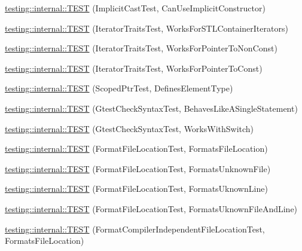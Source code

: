 \begin{DoxyCompactItemize}
\item 
\hyperlink{namespacetesting_1_1internal_ad5c2cf37cc5aa78744012255cae78f9b}{testing\-::internal\-::\-T\-E\-S\-T} (Implicit\-Cast\-Test, Can\-Use\-Implicit\-Constructor)
\item 
\hyperlink{namespacetesting_1_1internal_abd56ca990c5b8c1aea44d15028a74f33}{testing\-::internal\-::\-T\-E\-S\-T} (Iterator\-Traits\-Test, Works\-For\-S\-T\-L\-Container\-Iterators)
\item 
\hyperlink{namespacetesting_1_1internal_a642234d85836450bb8795cf0a8a9f908}{testing\-::internal\-::\-T\-E\-S\-T} (Iterator\-Traits\-Test, Works\-For\-Pointer\-To\-Non\-Const)
\item 
\hyperlink{namespacetesting_1_1internal_afc0e95a0472d243967fd4720c681c478}{testing\-::internal\-::\-T\-E\-S\-T} (Iterator\-Traits\-Test, Works\-For\-Pointer\-To\-Const)
\item 
\hyperlink{namespacetesting_1_1internal_a99f56e2e9d5b30a879f877cc72bb0c0c}{testing\-::internal\-::\-T\-E\-S\-T} (Scoped\-Ptr\-Test, Defines\-Element\-Type)
\item 
\hyperlink{namespacetesting_1_1internal_a26d00130a017a66d0d60dc5a02a13d25}{testing\-::internal\-::\-T\-E\-S\-T} (Gtest\-Check\-Syntax\-Test, Behaves\-Like\-A\-Single\-Statement)
\item 
\hyperlink{namespacetesting_1_1internal_a4dfd147ff396984fca799878cb53dcea}{testing\-::internal\-::\-T\-E\-S\-T} (Gtest\-Check\-Syntax\-Test, Works\-With\-Switch)
\item 
\hyperlink{namespacetesting_1_1internal_a1a1c20d78e9e75b9c7f2b767eb62611b}{testing\-::internal\-::\-T\-E\-S\-T} (Format\-File\-Location\-Test, Formats\-File\-Location)
\item 
\hyperlink{namespacetesting_1_1internal_ace2f5407afdfb0767035d44b6758e4a0}{testing\-::internal\-::\-T\-E\-S\-T} (Format\-File\-Location\-Test, Formats\-Unknown\-File)
\item 
\hyperlink{namespacetesting_1_1internal_a17d1f472b6c1154de7b5b008b964ee32}{testing\-::internal\-::\-T\-E\-S\-T} (Format\-File\-Location\-Test, Formats\-Uknown\-Line)
\item 
\hyperlink{namespacetesting_1_1internal_a1195aaf7258c5442de7aebd95acefb9f}{testing\-::internal\-::\-T\-E\-S\-T} (Format\-File\-Location\-Test, Formats\-Uknown\-File\-And\-Line)
\item 
\hyperlink{namespacetesting_1_1internal_a9c12f8c1ebb19906e8fa0c430d139076}{testing\-::internal\-::\-T\-E\-S\-T} (Format\-Compiler\-Independent\-File\-Location\-Test, Formats\-File\-Location)

\end{DoxyCompactItemize}
